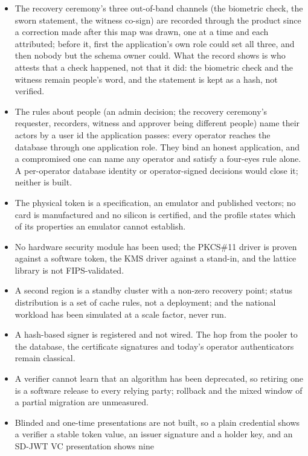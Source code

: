 \begin{itemize}
  \item The recovery ceremony's three out-of-band channels (the biometric check, the sworn
    statement, the witness co-sign) are recorded through the product since a correction made after
    this map was drawn, one at a time and each attributed; before it, first the application's own
    role could set all three, and then nobody but the schema owner could. What the record shows is
    who attests that a check happened, not that it did: the biometric check and the witness remain
    people's word, and the statement is kept as a hash, not verified.
  \item The rules about people (an admin decision; the recovery ceremony's requester, recorders,
    witness and approver being different people) name their actors by a user id the application
    passes: every operator reaches the database through one application role. They bind an honest
    application, and a compromised one can name any operator and satisfy a four-eyes rule alone. A
    per-operator database identity or operator-signed decisions would close it; neither is built.
  \item The physical token is a specification, an emulator and published vectors; no card is
    manufactured and no silicon is certified, and the profile states which of its properties an
    emulator cannot establish.
  \item No hardware security module has been used; the PKCS\#11 driver is proven against a software
    token, the KMS driver against a stand-in, and the lattice library is not FIPS-validated.
  \item A second region is a standby cluster with a non-zero recovery point; status distribution is
    a set of cache rules, not a deployment; and the national workload has been simulated at a scale
    factor, never run.
  \item A hash-based signer is registered and not wired. The hop from the pooler to the database,
    the certificate signatures and today's operator authenticators remain classical.
  \item A verifier cannot learn that an algorithm has been deprecated, so retiring one is a software
    release to every relying party; rollback and the mixed window of a partial migration are
    unmeasured.
  \item Blinded and one-time presentations are not built, so a plain credential shows a verifier a
    stable token value, an issuer signature and a holder key, and an SD-JWT VC presentation shows nine

\end{itemize}
